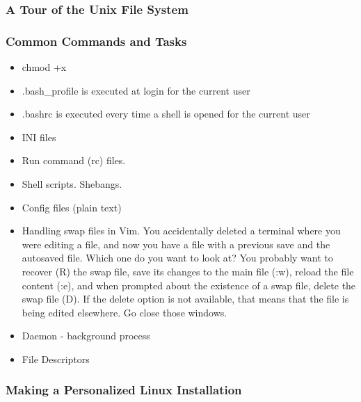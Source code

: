 
\subsubsection{A Tour of the Unix File System}



\subsubsection{Common Commands and Tasks}


\begin{itemize}
	\item chmod +x
	\item .bash\_profile is executed at login for the current user
	\item .bashrc is executed every time a shell is opened for the current user
	\item INI files
	\item Run command (rc) files.
	\item Shell scripts. Shebangs.
	\item Config files (plain text)
	\item Handling swap files in Vim. You accidentally deleted a terminal where you were editing a file, and now you have a file with a previous save and the autosaved file. Which one do you want to look at? You probably want to recover (R) the swap file, save its changes to the main file (:w), reload the file content (:e), and when prompted about the existence of a swap file, delete the swap file (D). If the delete option is not available, that means that the file is being edited elsewhere. Go close those windows.
	\item Daemon - background process
	\item File Descriptors
\end{itemize}

\subsubsection{Making a Personalized Linux Installation}

